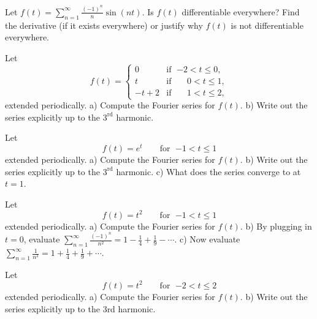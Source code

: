 \begin{exercise}
Let $f(t) = \sum_{n=1}^\infty \frac{{(-1)}^n}{n} \sin (n t)$.  Is $f(t)$
differentiable everywhere?  Find the derivative (if it exists everywhere) or
justify why $f(t)$ is not differentiable everywhere.
\end{exercise}

\begin{exercise}
Let
\begin{equation*}
f(t) =
\begin{cases}
0 & \text{if } \; {-2} < t \leq 0, \\
t & \text{if } \; \phantom{-}0 < t \leq 1, \\
-t+2 & \text{if } \; \phantom{-}1 < t \leq 2,
\end{cases}
\end{equation*}
extended periodically.
a) Compute the Fourier series for $f(t)$.  b) Write out the series explicitly up
to the $3^{\text{rd}}$ harmonic.
\end{exercise}

\begin{exercise}
Let
\begin{equation*}
f(t) = e^t \qquad \text{for } \; {-1} < t \leq 1
\end{equation*}
extended periodically.
a) Compute the Fourier series for $f(t)$.  b) Write out the series explicitly up
to the $3^{\text{rd}}$ harmonic. c) What does the series converge to at
$t=1$.
\end{exercise}

\begin{exercise}
Let
\begin{equation*}
f(t) = t^2 \qquad \text{for } \; {-1} < t \leq 1
\end{equation*}
extended periodically.
a) Compute the Fourier series for $f(t)$.
b) By plugging in $t=0$,
evaluate $\displaystyle \sum_{n=1}^\infty \frac{{(-1)}^n}{n^2} = 1 - \frac{1}{4} +
\frac{1}{9} - \cdots$.
c) Now evaluate $\displaystyle \sum_{n=1}^\infty \frac{1}{n^2} = 1 + \frac{1}{4} +
\frac{1}{9} + \cdots$.
\end{exercise}

\setcounter{exercise}{100}

\begin{exercise}
Let
\begin{equation*}
f(t) = t^2 \qquad \text{for } \; {-2} < t \leq 2
\end{equation*}
extended periodically. a) Compute the Fourier series for $f(t)$. b) Write out the series explicitly up to
the 3rd harmonic.
\end{exercise}

